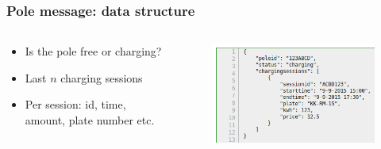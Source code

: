 \documentclass[11pt]{beamer}
\begin{document}
\begin{frame}
\frametitle{Pole message: data structure}
\begin{columns}
    \begin{column}{.5\textwidth}
        \begin{itemize}
            \item Is the pole free or charging?
            \item Last $n$ charging sessions
            \item Per session: id, time, amount, plate number etc.
        \end{itemize}
    \end{column}
    \begin{column}{.5\textwidth}
        \begin{figure}
        \centering
        \includegraphics[width=\linewidth]{datastructure.png}
        \end{figure}
    \end{column}
\end{columns}
\end{frame}
\end{document}
